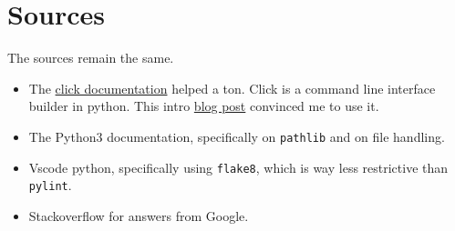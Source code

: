 \documentclass[11pt]{article}
\begin{document}
\section{Sources}
\label{sec:org16f87d6}
The sources remain the same.

\begin{itemize}
\item The \href{http://click.pocoo.org/5/}{click documentation} helped a ton.  Click is a command line interface builder in python.  This intro \href{https://kushaldas.in/posts/building-command-line-tools-in-python-with-click.html}{blog post} convinced me to use it.
\item The Python3 documentation, specifically on \texttt{pathlib} and on file handling.
\item Vscode python, specifically using \texttt{flake8}, which is way less restrictive than \texttt{pylint}.
\item Stackoverflow for answers from Google.
\end{itemize}
\end{document}
